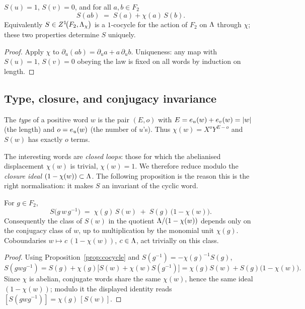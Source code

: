 \begin{prop}\label{prop:cocycle}
$S(u)=1$, $S(v)=0$, and for all $a,b\in F_2$
\[
   S(ab)\;=\;S(a)+\chi(a)\,S(b).
\]
Equivalently $S\in Z^1\!\big(F_2,\Lambda_\chi\big)$ is a $1$-cocycle for the action of $F_2$ on
$\Lambda$ through $\chi$; these two properties determine $S$ uniquely.
\end{prop}

\begin{proof}
Apply $\chi$ to $\partial_u(ab)=\partial_u a+a\,\partial_u b$. Uniqueness: any map with
$S(u)=1,\,S(v)=0$ obeying the law is fixed on all words by induction on length.
\end{proof}

\subsection*{Type, closure, and conjugacy invariance}

\begin{defn}\label{def:type}
The \emph{type} of a positive word $w$ is the pair $(E,o)$ with $E=e_{u}(w)+e_{v}(w)=|w|$ (the
length) and $o=e_{u}(w)$ (the number of $u$'s). Thus $\chi(w)=X^{o}Y^{E-o}$ and
$S(w)$ has exactly $o$ terms.
\end{defn}

The interesting words are \emph{closed loops}: those for which the abelianised displacement
$\chi(w)$ is trivial, $\chi(w)=1$. We therefore reduce modulo the \emph{closure ideal}
$(1-\chi(w))\subset\Lambda$. The following proposition is the reason this is the right
normalisation: it makes $S$ an invariant of the cyclic word.

\begin{prop}\label{prop:conj}
For $g\in F_2$,
\[
   S\!\big(g\,w\,g^{-1}\big)\;=\;\chi(g)\,S(w)\;+\;S(g)\,\big(1-\chi(w)\big).
\]
Consequently the class of $S(w)$ in the quotient $\Lambda/(1-\chi(w))$ depends only on the
conjugacy class of $w$, up to multiplication by the monomial unit $\chi(g)$. Coboundaries
$w\mapsto c\,(1-\chi(w))$, $c\in\Lambda$, act trivially on this class.
\end{prop}

\begin{proof}
Using Proposition~\ref{prop:cocycle} and $S(g^{-1})=-\chi(g)^{-1}S(g)$,
\[
   S(gwg^{-1})=S(g)+\chi(g)\big[S(w)+\chi(w)S(g^{-1})\big]
              =\chi(g)S(w)+S(g)\big(1-\chi(w)\big).
\]
Since $\chi$ is abelian, conjugate words share the same $\chi(w)$, hence the same ideal
$(1-\chi(w))$; modulo it the displayed identity reads $[S(gwg^{-1})]=\chi(g)\,[S(w)]$.
\end{proof}

